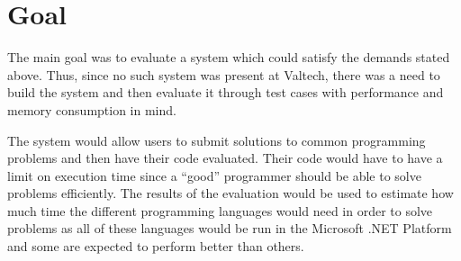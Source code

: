 \section{Goal}
The main goal was to evaluate a system which could satisfy the demands stated above. Thus, since no such system was present at Valtech, there was a need to build the system and then evaluate it through test cases with performance and memory consumption in mind.

The system would allow users to submit solutions to common programming problems and then have their code evaluated. Their code would have to have a limit on execution time since a ``good'' programmer should be able to solve problems efficiently. The results of the evaluation would be used to estimate how much time the different programming languages would need in order to solve problems as all of these languages would be run in the Microsoft .NET Platform and some are expected to perform better than others.
